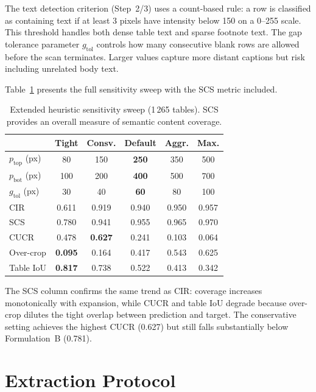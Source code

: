 \documentclass[pdflatex,sn-mathphys-num,iicol]{sn-jnl}
\begin{document}
\begin{appendices}
The text detection criterion (Step~2/3) uses a count-based rule: a row is classified
as containing text if at least 3 pixels have intensity below 150 on a 0--255 scale.
This threshold handles both dense table text and sparse footnote text. The gap
tolerance parameter $g_{\text{tol}}$ controls how many consecutive blank rows are
allowed before the scan terminates. Larger values capture more distant captions but
risk including unrelated body text.

Table~\ref{tab:sweep_extended} presents the full sensitivity sweep with the SCS
metric included.

\begin{table}[ht!]
\caption{Extended heuristic sensitivity sweep (1\,265 tables). SCS provides an
overall measure of semantic content coverage.}
\label{tab:sweep_extended}
\footnotesize\setlength{\tabcolsep}{3pt}
\begin{tabular}{@{}lccccc@{}}
\toprule
& \textbf{Tight} & \textbf{Consv.} & \textbf{Default} & \textbf{Aggr.} & \textbf{Max.} \\
\midrule
$p_{\text{top}}$ (px) & 80 & 150 & \textbf{250} & 350 & 500 \\
$p_{\text{bot}}$ (px) & 100 & 200 & \textbf{400} & 500 & 700 \\
$g_{\text{tol}}$ (px) & 30 & 40 & \textbf{60} & 80 & 100 \\
\midrule
CIR & 0.611 & 0.919 & 0.940 & 0.950 & 0.957 \\
SCS & 0.780 & 0.941 & 0.955 & 0.965 & 0.970 \\
CUCR & 0.478 & \textbf{0.627} & 0.241 & 0.103 & 0.064 \\
Over-crop & \textbf{0.095} & 0.164 & 0.417 & 0.543 & 0.625 \\
Table IoU & \textbf{0.817} & 0.738 & 0.522 & 0.413 & 0.342 \\
\bottomrule
\end{tabular}
\end{table}

The SCS column confirms the same trend as CIR: coverage increases monotonically with
expansion, while CUCR and table IoU degrade because over-crop dilutes the tight
overlap between prediction and target. The conservative setting achieves the highest
CUCR (0.627) but still falls substantially below Formulation~B (0.781).


\section{Extraction Protocol}\label{app:prompts}


\end{appendices}
\end{document}
